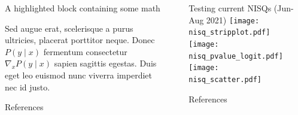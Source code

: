 \documentclass[final]{beamer}
\newlength{\sepwidth}
\newlength{\colwidth}
\newcommand{\separatorcolumn}{\begin{column}{\sepwidth}\end{column}}
\begin{document}
\begin{frame}[t]
\begin{columns}[t]
\begin{column}{\colwidth}
\begin{exampleblock}{A highlighted block containing some math}

    Sed augue erat, scelerisque a purus ultricies, placerat porttitor neque.
    Donec $P(y \mid x)$ fermentum consectetur $\nabla_x P(y \mid x)$ sapien
    sagittis egestas. Duis eget leo euismod nunc viverra imperdiet nec id
    justo.

  \end{exampleblock}

  \begin{block}{References}

    \nocite{*}
    \footnotesize{}

  \end{block}

\end{column}
\separatorcolumn

\begin{column}{\colwidth}
  \begin{block}{Testing current NISQs (Jun-Aug 2021)}
    \texttt{[image: nisq\_stripplot.pdf]}
    \texttt{[image: nisq\_pvalue\_logit.pdf]}
    \texttt{[image: nisq\_scatter.pdf]}

  \end{block}


  \begin{block}{References}

    \nocite{*}
    \footnotesize{}

  \end{block}

\end{column}

\separatorcolumn
\end{columns}
\end{frame}
\end{document}
